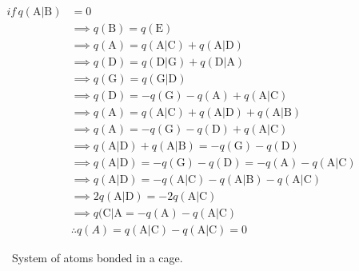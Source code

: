 \begin{align}
  if\, q(\mathrm{A}|\mathrm{B}) &= 0 \nonumber \\
    & \implies q(\mathrm{B}) = q(\mathrm{E}) \nonumber \\
    & \implies q(\mathrm{A}) = q(\mathrm{A}|\mathrm{C}) + q(\mathrm{A}|\mathrm{D}) \nonumber \\
    & \implies q(\mathrm{D}) = q(\mathrm{D}|\mathrm{G}) + q(\mathrm{D}|\mathrm{A}) \nonumber \\
    & \implies q(\mathrm{G}) = q(\mathrm{G}|\mathrm{D}) \nonumber \\
    & \implies q(\mathrm{D}) = -q(\mathrm{G}) -q(\mathrm{A}) + q(\mathrm{A}|\mathrm{C}) \nonumber \\
    & \implies q(\mathrm{A}) = q(\mathrm{A}|\mathrm{C}) + q(\mathrm{A}|\mathrm{D}) + q(\mathrm{A}|\mathrm{B})\nonumber \\
    & \implies q(\mathrm{A}) = -q(\mathrm{G}) - q(\mathrm{D}) + q(\mathrm{A}|\mathrm{C})\nonumber \\
    & \implies q(\mathrm{A}|\mathrm{D}) + q(\mathrm{A}|\mathrm{B}) = -q(\mathrm{G}) - q(\mathrm{D}) \nonumber \\
    & \implies q(\mathrm{A}|\mathrm{D}) = -q(\mathrm{G}) - q(\mathrm{D}) = -q(\mathrm{A}) -q(\mathrm{A}|\mathrm{C})\nonumber \\
    & \implies q(\mathrm{A}|\mathrm{D}) = -q(\mathrm{A}|\mathrm{C}) - q(\mathrm{A}|\mathrm{B}) -q(\mathrm{A}|\mathrm{C})\nonumber \\
    & \implies 2q(\mathrm{A}|\mathrm{D}) = -2q(\mathrm{A}|\mathrm{C}) \nonumber \\
    & \implies q(\mathrm{C}|\mathrm{A} = -q(\mathrm{A}) -q(\mathrm{A}|\mathrm{C}) \nonumber \\
    & \therefore q(A) = q(\mathrm{A}|\mathrm{C}) -q(\mathrm{A}|\mathrm{C}) = 0
\end{align}

\newpage

\begin{figure}[ht]
  \centering
  \scalebox{.4}{}
  \caption{System of atoms bonded in a cage.}
\end{figure}

